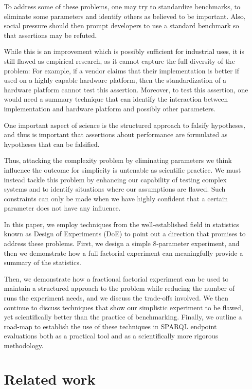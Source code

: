 \documentclass{llncs}
\begin{document}
To address some of these problems, one may try to standardize
benchmarks, to eliminate some parameters and identify others as
believed to be important. Also, social pressure should then prompt
developers to use a standard benchmark so that assertions may be
refuted.

While this is an improvement which is possibly sufficient for
industrial uses, it is still flawed as empirical research, as it
cannot capture the full diversity of the problem: For example, if a
vendor claims that their implementation is better if used on a highly
capable hardware platform, then the standardization of a hardware
platform cannot test this assertion. Moreover, to test this assertion,
one would need a summary technique that can identify the interaction
between implementation and hardware platform and possibly other
parameters.

One important aspect of science is the structured approach to falsify
hypotheses, and thus is important that assertions about performance
are formulated as hypotheses that can be falsified.

Thus, attacking the complexity problem by eliminating parameters we
think influence the outcome for simplicity is untenable as scientific
practice. We must instead tackle this problem by enhancing our
capability of testing complex systems and to identify situations where
our assumptions are flawed. Such constraints can only be made when we
have highly confident that a certain parameter does not have any
influence.

In this paper, we employ techniques from the well-established field in
statistics known as Design of Experiments (DoE) to point out a
direction that promises to address these problems. First, we design a
simple 8-parameter experiment, and then we demonstrate how a full
factorial experiment can meaningfully provide a summary of the
statistics.

Then, we demonstrate how a fractional factorial experiment can be used
to maintain a structured approach to the problem while reducing the
number of runs the experiment needs, and we discuss the trade-offs
involved. We then continue to discuss techniques that show our
simplistic experiment to be flawed, yet scientifically better than the
practice of benchmarking. Finally, we outline a road-map to establish
the use of these techniques in SPARQL endpoint evaluations both as a
practical tool and as a scientifically more rigorous methodology.

\section{Related work}
\end{document}
